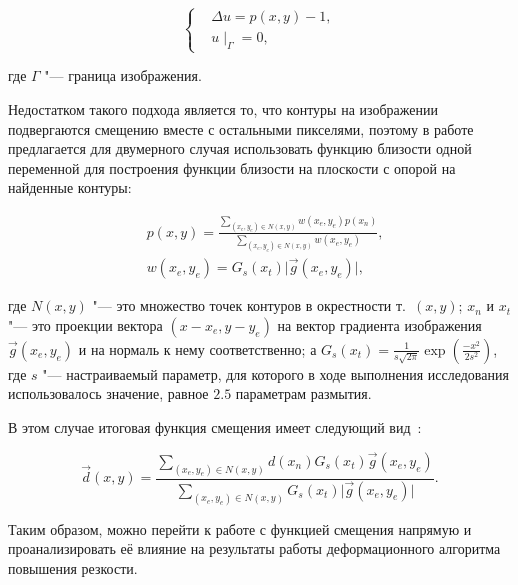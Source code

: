 \begin{equation*}
	\left\{
		\begin{aligned}
			&\Delta u = p\left(x,y\right) - 1, \\
			&u\mid_\Gamma=0,
		\end{aligned}
	\right.
\end{equation*}

\noindent где $\Gamma$ "--- граница изображения.

Недостатком такого подхода является то, что контуры на изображении подвергаются смещению вместе с остальными пикселями, поэтому в работе~\cite{gusev2016parallel} предлагается для двумерного случая использовать функцию близости одной переменной для построения функции близости на плоскости с опорой на найденные контуры:

\begin{align*}
	&p\left(x,y\right) = \frac{\sum_{\left(x_e,y_e\right) \in N\left(x,y\right)}{w\left(x_e,y_e\right)p\left(x_n\right)}} {\sum_{\left(x_e,y_e\right) \in N\left(x,y\right)}{w\left(x_e,y_e\right)}}, \\
	&w\left(x_e,y_e\right) = G_{s}\left(x_t\right)\lvert \vec{g}\left(x_e,y_e\right) \rvert,
\end{align*}

\noindent где $N\left(x,y\right)$ "--- это множество точек контуров в окрестности т.~$\left(x, y\right)$; $x_n$ и $x_t$ "--- это проекции вектора $\left(x-x_e, y-y_e\right)$ на вектор градиента изображения $\vec{g}\left(x_e,y_e\right)$ и на нормаль к нему соответственно; а $G_{s}\left(x_t\right) = \frac{1}{s \sqrt{2\pi}} \exp\left(\frac{-x^2}{2s^2}\right)$, где $s$ "--- настраиваемый параметр, для которого в ходе выполнения исследования использовалось значение, равное $2.5$ параметрам размытия.

В этом случае итоговая функция смещения имеет следующий вид~\cite{gusev2016parallel}:

\begin{equation*}
	\vec{d}\left(x,y\right) = \frac{\sum_{\left(x_e,y_e\right) \in N\left(x,y\right)}{d\left(x_n\right) G_{s}\left(x_t\right) \vec{g}\left(x_e,y_e\right) }} {\sum_{\left(x_e,y_e\right) \in N\left(x,y\right)}{G_{s}\left(x_t\right)\lvert \vec{g}\left(x_e,y_e\right) \rvert}}.
\end{equation*}

Таким образом, можно перейти к работе с функцией смещения напрямую и проанализировать её влияние на результаты работы деформационного алгоритма повышения резкости.

